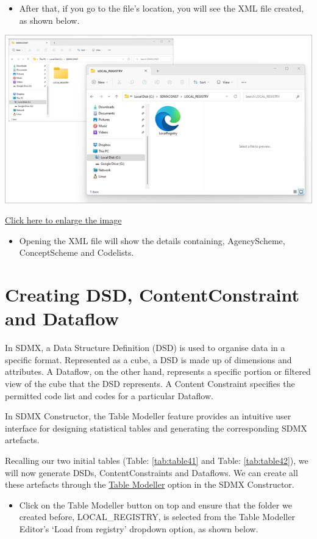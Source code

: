 \documentclass[
]{book}
\providecommand{\tightlist}{%
  \setlength{\itemsep}{0pt}\setlength{\parskip}{0pt}}
\begin{document}
\begin{itemize}
\tightlist
\item
  After that, if you go to the file's location, you will see the XML file created, as shown below.
\end{itemize}

\begin{center}\includegraphics[width=0.5\linewidth]{./images/image129} \end{center}

\href{images/image129.png}{Click here to enlarge the image}

\begin{itemize}
\tightlist
\item
  Opening the XML file will show the details containing, AgencyScheme, ConceptScheme and Codelists.
\end{itemize}

\hypertarget{creating-dsd}{%
\section{Creating DSD, ContentConstraint and Dataflow}\label{creating-dsd}}

In SDMX, a Data Structure Definition (DSD) is used to organise data in a specific format. Represented as a cube, a DSD is made up of dimensions and attributes. A Dataflow, on the other hand, represents a specific portion or filtered view of the cube that the DSD represents. A Content Constraint specifies the permitted code list and codes for a particular Dataflow.

In SDMX Constructor, the Table Modeller feature provides an intuitive user interface for designing statistical tables and generating the corresponding SDMX artefacts.

Recalling our two initial tables (Table: \ref{tab:table41} and Table: \ref{tab:table42}), we will now generate DSDs, ContentConstraints and Dataflows. We can create all these artefacts through the \protect\hyperlink{table-modeller}{Table Modeller} option in the SDMX Constructor.

\begin{itemize}
\tightlist
\item
  Click on the Table Modeller button on top and ensure that the folder we created before, LOCAL\_REGISTRY, is selected from the Table Modeller Editor's `Load from registry' dropdown option, as shown below.
\end{itemize}
\end{document}
